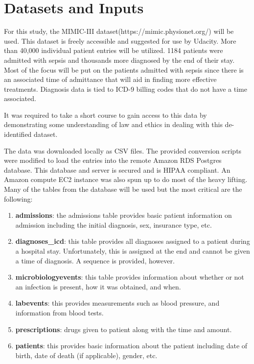 \documentclass[11pt]{article}
\begin{document}
\section{Datasets and Inputs}
For this study, the MIMIC-III dataset(https://mimic.physionet.org/) will be used. This dataset is freely accessible and suggested for use by Udacity. More than 40,000 individual patient entries will be utilized. 1184 patients were admitted with sepsis and thousands more diagnosed by the end of their stay. Most of the focus will be put on the patients admitted with sepsis since there is an associated time of admittance that will aid in finding more effective treatments. Diagnosis data is tied to ICD-9 billing codes that do not have a time associated.

It was required to take a short course to gain access to this data by demonstrating some understanding of law and ethics in dealing with this de-identified dataset.

The data was downloaded locally as CSV files. The provided conversion scripts were modified to load the entries into the remote Amazon RDS Postgres database. This database and server is secured and is HIPAA compliant. An Amazon compute EC2 instance was also spun up to do most of the heavy lifting. Many of the tables from the database will be used but the most critical are the following:
\begin{enumerate}
\item \textbf{admissions}: the admissions table provides basic patient information on admission including the initial diagnosis, sex, insurance type, etc.
\item \textbf{diagnoses\_icd}: this table provides all diagnoses assigned to a patient during a hospital stay. Unfortunately, this is assigned at the end and cannot be given a time of diagnosis. A sequence is provided, however.
\item \textbf{microbiologyevents}: this table provides information about whether or not an infection is present, how it was obtained, and when.
\item \textbf{labevents}: this provides measurements such as blood pressure, and information from blood tests.
\item \textbf{prescriptions}: drugs given to patient along with the time and amount.
\item \textbf{patients}: this provides basic information about the patient including date of birth, date of death (if applicable), gender, etc.
\end{enumerate}
\end{document}
